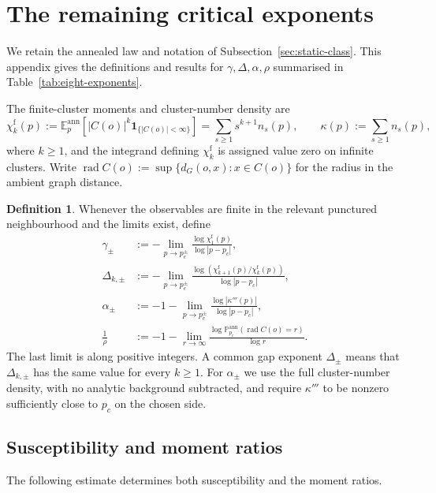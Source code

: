 \documentclass[scheme=plain,11pt]{ctexart}
\theoremstyle{definition}
\newtheorem{definition}[theorem]{Definition}
\theoremstyle{remark}
\newcommand{\dist}{d}
\begin{document}
\clearpage
\appendix
\section{The remaining critical exponents}\label{app:other-critical-exponents}

We retain the annealed law and notation of Subsection~\ref{sec:static-class}.
This appendix gives the definitions and results for $\gamma,\Delta,\alpha,\rho$ summarised in Table~\ref{tab:eight-exponents}.

The finite-cluster moments and cluster-number density are
\[
 \chi_k^{\mathrm f}(p):=\mathbb E_p^{\mathrm{ann}}
 [|C(o)|^k\mathbf1_{\{|C(o)|<\infty\}}]
 =\sum_{s\ge1}s^{k+1}n_s(p),\qquad
 \kappa(p):=\sum_{s\ge1}n_s(p),
\]
where $k\ge1$, and the integrand defining $\chi_k^{\mathrm f}$ is assigned value zero on infinite clusters.
Write $\operatorname{rad}C(o):=\sup\{\dist_G(o,x):x\in C(o)\}$ for the radius in the ambient graph distance.

\begin{definition}\label{def:other-exponents}
Whenever the observables are finite in the relevant punctured neighbourhood and the limits exist, define
\begin{align*}
 \gamma_\pm&:=-\lim_{p\to p_c^\pm}
 \frac{\log\chi_1^{\mathrm f}(p)}{\log|p-p_c|},\\
 \Delta_{k,\pm}&:=-\lim_{p\to p_c^\pm}
 \frac{\log(\chi_{k+1}^{\mathrm f}(p)/\chi_k^{\mathrm f}(p))}{\log|p-p_c|},\\
 \alpha_\pm&:=-1-\lim_{p\to p_c^\pm}
 \frac{\log|\kappa'''(p)|}{\log|p-p_c|},\\
 \frac1\rho&:=-1-\lim_{r\to\infty}
 \frac{\log\mathbb P_{p_c}^{\mathrm{ann}}(\operatorname{rad}C(o)=r)}{\log r}.
\end{align*}
The last limit is along positive integers.
A common gap exponent $\Delta_\pm$ means that $\Delta_{k,\pm}$ has the same value for every $k\ge1$.
For $\alpha_\pm$ we use the full cluster-number density, with no analytic background subtracted, and require $\kappa'''$ to be nonzero sufficiently close to $p_c$ on the chosen side.
\end{definition}

\subsection*{Susceptibility and moment ratios}
The following estimate determines both susceptibility and the moment ratios.
\end{document}
